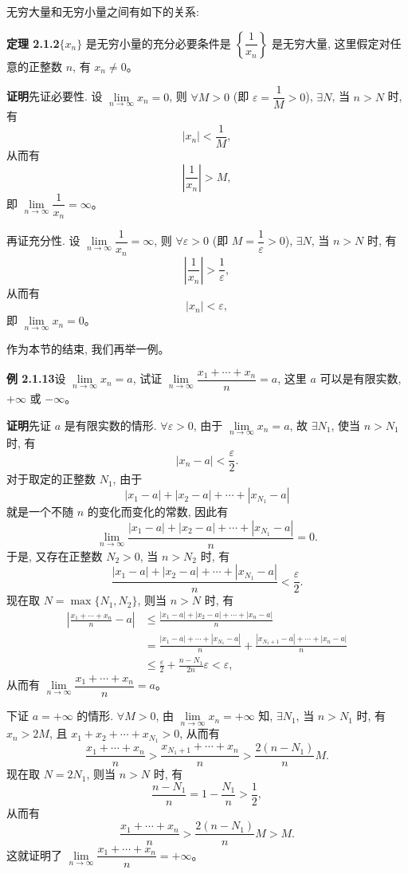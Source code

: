\documentclass[UTF8,12pt,a4paper,fontset=fandol]{ctexart}
\begin{document}
无穷大量和无穷小量之间有如下的关系:

\noindent\textbf{定理 2.1.2}\quad $\{x_n\}$ 是无穷小量的充分必要条件是 $\left\{\dfrac1{x_n}\right\}$ 是无穷大量, 这里假定对任意的正整数 $n$, 有 $x_n\ne0$。

\noindent\textbf{证明}\quad 先证必要性. 设 $\lim\limits_{n\to\infty}x_n=0$, 则 $\forall M>0$ (即 $\varepsilon=\dfrac1M>0$), $\exists N$, 当 $n>N$ 时, 有
\[
  |x_n|<\frac1M,
\]
从而有
\[
  \left|\frac1{x_n}\right|>M,
\]
即 $\lim\limits_{n\to\infty}\dfrac1{x_n}=\infty$。

再证充分性. 设 $\lim\limits_{n\to\infty}\dfrac1{x_n}=\infty$, 则 $\forall\varepsilon>0$ (即 $M=\dfrac1\varepsilon>0$), $\exists N$, 当 $n>N$ 时, 有
\[
  \left|\frac1{x_n}\right|>\frac1\varepsilon,
\]
从而有
\[
  |x_n|<\varepsilon,
\]
即 $\lim\limits_{n\to\infty}x_n=0$。

作为本节的结束, 我们再举一例。

\noindent\textbf{例 2.1.13}\quad 设 $\lim\limits_{n\to\infty}x_n=a$, 试证 $\lim\limits_{n\to\infty}\dfrac{x_1+\cdots+x_n}{n}=a$, 这里 $a$ 可以是有限实数, $+\infty$ 或 $-\infty$。

\noindent\textbf{证明}\quad 先证 $a$ 是有限实数的情形. $\forall\varepsilon>0$, 由于 $\lim\limits_{n\to\infty}x_n=a$, 故 $\exists N_1$, 使当 $n>N_1$ 时, 有
\[
  |x_n-a|<\frac\varepsilon2.
\]
对于取定的正整数 $N_1$, 由于
\[
  |x_1-a|+|x_2-a|+\cdots+|x_{N_1}-a|
\]
就是一个不随 $n$ 的变化而变化的常数, 因此有
\[
  \lim_{n\to\infty}
  \frac{|x_1-a|+|x_2-a|+\cdots+|x_{N_1}-a|}{n}=0.
\]
于是, 又存在正整数 $N_2>0$, 当 $n>N_2$ 时, 有
\[
  \frac{|x_1-a|+|x_2-a|+\cdots+|x_{N_1}-a|}{n}<\frac\varepsilon2.
\]
现在取 $N=\max\{N_1,N_2\}$, 则当 $n>N$ 时, 有
\[
\begin{aligned}
  \left|\frac{x_1+\cdots+x_n}{n}-a\right|
  &\leqslant
  \frac{|x_1-a|+|x_2-a|+\cdots+|x_n-a|}{n}\\
  &=
  \frac{|x_1-a|+\cdots+|x_{N_1}-a|}{n}
  +
  \frac{|x_{N_1+1}-a|+\cdots+|x_n-a|}{n}\\
  &\leqslant \frac\varepsilon2+\frac{n-N_1}{2n}\varepsilon<\varepsilon,
\end{aligned}
\]
从而有 $\lim\limits_{n\to\infty}\dfrac{x_1+\cdots+x_n}{n}=a$。

下证 $a=+\infty$ 的情形. $\forall M>0$, 由 $\lim\limits_{n\to\infty}x_n=+\infty$ 知, $\exists N_1$, 当 $n>N_1$ 时, 有 $x_n>2M$, 且 $x_1+x_2+\cdots+x_{N_1}>0$, 从而有
\[
  \frac{x_1+\cdots+x_n}{n}
  >
  \frac{x_{N_1+1}+\cdots+x_n}{n}
  >
  \frac{2(n-N_1)}nM.
\]
现在取 $N=2N_1$, 则当 $n>N$ 时, 有
\[
  \frac{n-N_1}{n}=1-\frac{N_1}{n}>\frac12,
\]
从而有
\[
  \frac{x_1+\cdots+x_n}{n}
  >
  \frac{2(n-N_1)}nM>M.
\]
这就证明了 $\lim\limits_{n\to\infty}\dfrac{x_1+\cdots+x_n}{n}=+\infty$。
\end{document}
